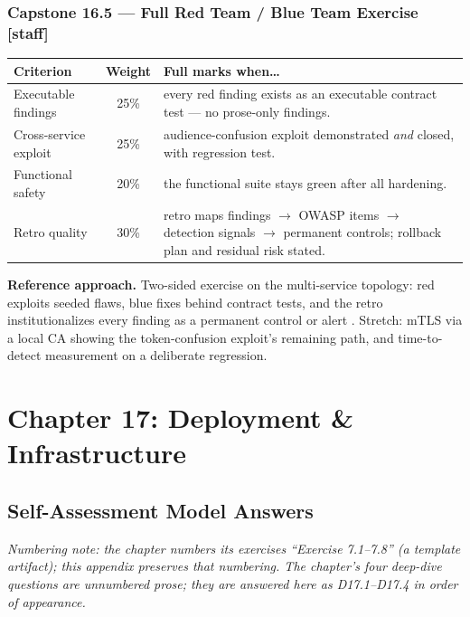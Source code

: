 \subsubsection*{Capstone 16.5 --- Full Red Team / Blue Team Exercise [staff]}
\begin{center}\small
\begin{tabularx}{\textwidth}{l c X}
\toprule
\textbf{Criterion} & \textbf{Weight} & \textbf{Full marks when\ldots} \\
\midrule
Executable findings & 25\% & every red finding exists as an executable contract test --- no prose-only findings. \\
Cross-service exploit & 25\% & audience-confusion exploit demonstrated \emph{and} closed, with regression test. \\
Functional safety & 20\% & the functional suite stays green after all hardening. \\
Retro quality & 30\% & retro maps findings $\to$ OWASP items $\to$ detection signals $\to$ permanent controls; rollback plan and residual risk stated. \\
\bottomrule
\end{tabularx}
\end{center}
\textbf{Reference approach.} Two-sided exercise on the multi-service
topology: red exploits seeded flaws, blue fixes behind contract tests, and
the retro institutionalizes every finding as a permanent control or alert
\cite{owaspapisecurity}. Stretch: mTLS via a local CA showing the
token-confusion exploit's remaining path, and time-to-detect measurement on
a deliberate regression.

\section{Chapter 17: Deployment \& Infrastructure}
\label{sec:sol-ch17}

\subsection{Self-Assessment Model Answers}

\emph{Numbering note: the chapter numbers its exercises ``Exercise
7.1--7.8'' (a template artifact); this appendix preserves that numbering.
The chapter's four deep-dive questions are unnumbered prose; they are
answered here as D17.1--D17.4 in order of appearance.}

